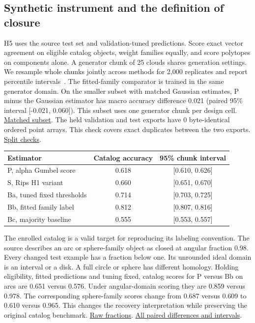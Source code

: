 \documentclass[10pt]{article}
\newcommand{\evidence}[2]{\href{https://github.com/BurnyCoder/topology-of-neural-geometry-in-llm-mechanistic-interpretability/blob/main/#1}{#2}}
\begin{document}
\subsection{Synthetic instrument and the definition of closure}

H5 uses the source test set and validation-tuned predictions. Score exact vector agreement on eligible catalog objects, weight families equally, and score polytopes on components alone. A generator chunk of 25 clouds shares generation settings. We resample whole chunks jointly across methods for 2,000 replicates and report percentile intervals~\citep{field2007}. The fitted-family comparator is trained in the same generator domain. On the smaller subset with matched Gaussian estimates, P minus the Gaussian estimator has macro accuracy difference 0.021 (paired 95\% interval [-0.021, 0.060]). This subset uses one generator chunk per design cell. \evidence{results/science/mc_subset.csv}{Matched subset}. The held validation and test exports have 0 byte-identical ordered point arrays. This check covers exact duplicates between the two exports. \evidence{results/science/splits.json}{Split checks}.

\begin{center}\small
\begin{tabular}{lcc}\toprule
Estimator & Catalog accuracy & 95\% chunk interval\\\midrule
P, alpha Gumbel score & 0.618 & [0.610, 0.626]\\
S, Rips H1 variant & 0.660 & [0.651, 0.670]\\
Ba, tuned fixed thresholds & 0.714 & [0.703, 0.725]\\
Bb, fitted family label & 0.812 & [0.807, 0.816]\\
Bc, majority baseline & 0.555 & [0.553, 0.557]\\\bottomrule
\end{tabular}\end{center}

The enrolled catalog is a valid target for reproducing its labeling convention. The source describes an arc or sphere-family object as closed at angular fraction 0.98. Every changed test example has a fraction below one. Its unrounded ideal domain is an interval or a disk. A full circle or sphere has different homology. Holding eligibility, fitted predictions and tuning fixed, catalog scores for P versus Bb on arcs are 0.651 versus 0.576. Under angular-domain scoring they are 0.859 versus 0.978. The corresponding sphere-family scores change from 0.687 versus 0.609 to 0.610 versus 0.965. This changes the recovery interpretation while preserving the original catalog benchmark. \evidence{results/science/angular_domains.csv}{Raw fractions}. \evidence{results/science/benchmark.csv}{All paired differences and intervals}.
\end{document}
